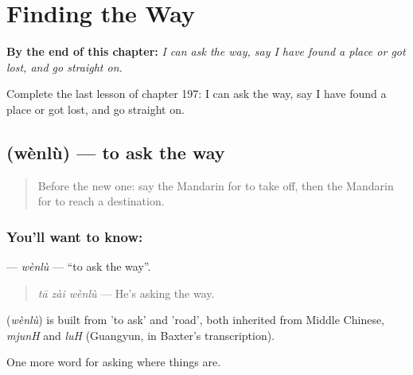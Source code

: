 
\chapter{Finding the Way}
\label{ch:zh-finding-the-way}

\begin{chapteropening}
\textbf{By the end of this chapter:} \emph{I can ask the way, say I have found a place or got lost, and go straight on.}

Complete the last lesson of chapter 197: I can ask the way, say I have found a place or got lost, and go straight on.
\end{chapteropening}

\section[\texorpdfstring{\zh{问路} (wènlù)}{问路 (wènlù)}]{ (wènlù) — to ask the way}

\label{lesson:ZH-C197-wenlu}



\begin{quote}
Before the new one: say the Mandarin for to take off, then the Mandarin for to reach a destination.
\end{quote}

\subsection*{You'll want to know: }
\textbf{} — \emph{wènlù} — \textquotedblleft{}to ask the way\textquotedblright{}.

\begin{quote}
\textbf{} \emph{tā zài wènlù} — He's asking the way.
\end{quote}

\begin{cousinweb}
\textbf{} (\emph{wènlù}) is built from  'to ask' and  'road', both inherited from Middle Chinese, \emph{mjunH} and \emph{luH} (Guangyun, in Baxter's transcription).
\end{cousinweb}

\begin{grammarlens}[title={What you've built}]
One more word for asking where things are.
\end{grammarlens}

